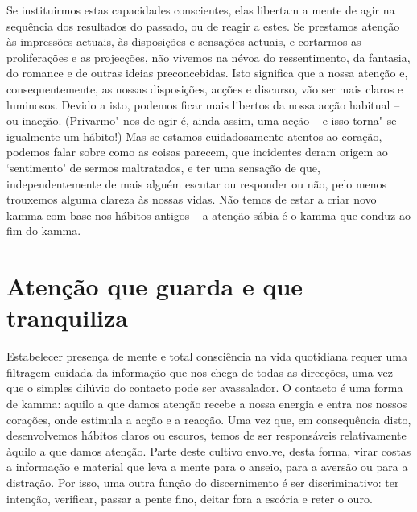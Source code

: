Se instituirmos estas capacidades conscientes, elas libertam a mente de agir na
sequência dos resultados do passado, ou de reagir a estes. Se prestamos atenção
às impressões actuais, às disposições e sensações actuais, e cortarmos as
proliferações e as projecções, não vivemos na névoa do ressentimento, da
fantasia, do romance e de outras ideias preconcebidas. Isto significa que a
nossa atenção e, consequentemente, as nossas disposições, acções e discurso, vão
ser mais claros e luminosos. Devido a isto, podemos ficar mais libertos da nossa
acção habitual -- ou inacção. (Privarmo"-nos de agir é, ainda assim, uma acção --
e isso torna"-se igualmente um hábito!) Mas se estamos cuidadosamente atentos ao
coração, podemos falar sobre como as coisas parecem, que incidentes deram origem
ao `sentimento' de sermos maltratados, e ter uma sensação de que,
independentemente de mais alguém escutar ou responder ou não, pelo menos
trouxemos alguma clareza às nossas vidas. Não temos de estar a criar novo kamma
com base nos hábitos antigos -- a atenção sábia é o kamma que conduz ao fim do
kamma.

\section{Atenção que guarda e que tranquiliza}

Estabelecer presença de mente e total consciência na vida quotidiana requer uma
filtragem cuidada da informação que nos chega de todas as direcções, uma vez que
o simples dilúvio do contacto pode ser avassalador. O contacto é uma forma de
kamma: aquilo a que damos atenção recebe a nossa energia e entra nos nossos
corações, onde estimula a acção e a reacção.
Uma vez que, em consequência disto, desenvolvemos hábitos claros ou escuros,
temos de ser responsáveis relativamente àquilo a que damos atenção. Parte deste
cultivo envolve, desta forma, virar costas a informação e material que leva a
mente para o anseio, para a aversão ou para a distração. Por isso, uma outra
função do discernimento é ser discriminativo: ter intenção, verificar, passar a
pente fino, deitar fora a escória e reter o ouro.

